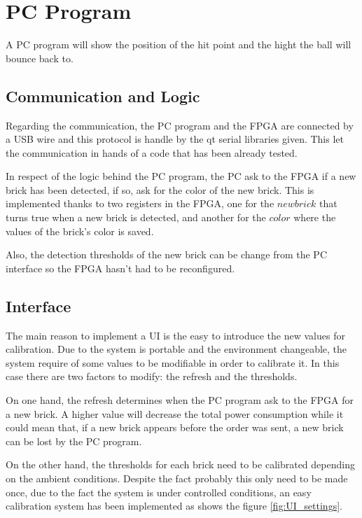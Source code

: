 \chapter{PC Program}
\label{chap:pc_program}
A PC program will show the position of the hit point and the hight the ball will bounce back to.

\section{Communication and Logic}
\label{subsec:pc_program_com}
Regarding the communication, the PC program and the FPGA are connected by a USB wire and this protocol is handle by the qt serial libraries given. This let the communication in hands of a code that has been already tested.

In respect of the logic behind the PC program, the PC ask to the FPGA if a new brick has been detected, if so, ask for the color of the new brick. This is implemented thanks to two registers in the FPGA, one for the $new brick$ that turns true when a new brick is detected, and another for the $color$ where the values of the brick's color is saved.

Also, the detection thresholds of the new brick can be change from the PC interface so the FPGA hasn't had to be reconfigured.  

\section{Interface}
\label{subsec:pc_program_interface}
The main reason to implement a UI is the easy to introduce the new values for calibration. Due to the system is portable and the environment changeable, the system require of some values to be modifiable in order to calibrate it. In this case there are two factors to modify: the refresh and the thresholds. 

On one hand, the refresh determines when the PC program ask to the FPGA for a new brick. A higher value will decrease the total power consumption while it could mean that, if a new brick appears before the order was sent, a new brick can be lost by the PC program.

On the other hand, the thresholds for each brick need to be calibrated depending on the ambient conditions. Despite the fact probably this only need to be made once, due to the fact the system is under controlled conditions, an easy calibration system has been implemented as shows the figure \ref{fig:UI_settings}.

